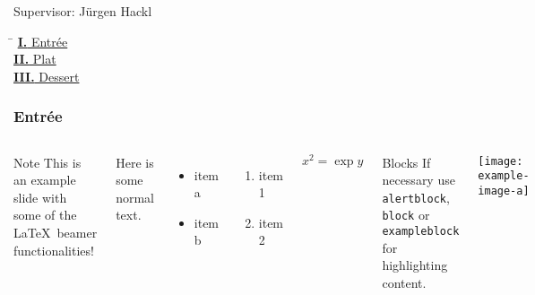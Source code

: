 \documentclass[aspectratio=169]{beamer}
\begin{document}
\begin{frame}[plain]
  \centering
  \vspace*{\fill}

  {\Huge\bfseries\inserttitle\par}
  \vspace{0.5cm}
  {\Large\insertauthor\par}
  \vspace{0.3cm}
  {Supervisor: J\"urgen Hackl\par}
  \vspace{0.5cm}

  \begin{tcolorbox}[contentsbox]
    \begin{tabbing}
      \hspace{1.5cm} \= \kill
      \hyperlink{first-part}{\textbf{I.} \quad Entrée} \\
      \hyperlink{second-part}{\textbf{II.} \quad Plat} \\
      \hyperlink{third-part}{\textbf{III.} \quad Dessert} \\
    \end{tabbing}
  \end{tcolorbox}

  \vspace*{\fill}
  {\large\insertdate\par}
\end{frame}


\begin{frame}[label=first-part]
\frametitle{Entr\'ee}

  
  \begin{columns}[T]
    \begin{alertblock}{Note}
      This is an example slide with some of the \alert{\LaTeX~beamer functionalities!}
    \end{alertblock}

    Here is some normal text.

    \begin{itemize}
    \item item a
    \item item b
    \end{itemize}

    \begin{enumerate}
    \item item 1
    \item item 2
    \end{enumerate}
    \[
      x^{2}=\exp{y}
    \]

    \begin{block}{Blocks}
      If necessary use \texttt{alertblock}, \texttt{block} or \texttt{exampleblock} for \alert{highlighting} content.
    \end{block}
    
    \centering
    \texttt{[image: example-image-a]}
  \end{columns}

\end{frame}
\end{document}
